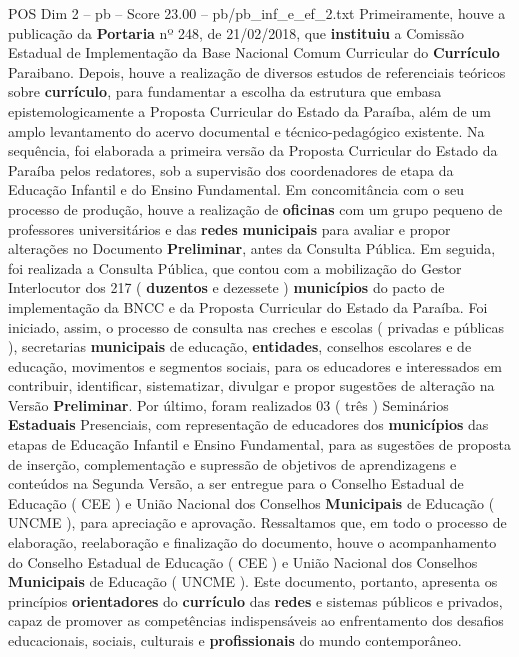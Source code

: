 \begin{textsample}{POS Dim 2 – pb – Score 23.00 – pb/pb\_inf\_e\_ef\_2.txt}
Primeiramente, houve a publicação da \textbf{Portaria} nº 248, de 21/02/2018, que \textbf{instituiu} a Comissão Estadual de Implementação da Base Nacional Comum Curricular do \textbf{Currículo} Paraibano.
Depois, houve a realização de diversos estudos de referenciais teóricos sobre \textbf{currículo}, para fundamentar a escolha da estrutura que embasa epistemologicamente a Proposta Curricular do Estado da Paraíba, além de um amplo levantamento do acervo documental e técnico-pedagógico existente.
Na sequência, foi elaborada a primeira versão da Proposta Curricular do Estado da Paraíba pelos redatores, sob a supervisão dos coordenadores de etapa da Educação Infantil e do Ensino Fundamental.
Em concomitância com o seu processo de produção, houve a realização de \textbf{oficinas} com um grupo pequeno de professores universitários e das \textbf{redes} \textbf{municipais} para avaliar e propor alterações no Documento \textbf{Preliminar}, antes da Consulta Pública.
Em seguida, foi realizada a Consulta Pública, que contou com a mobilização do Gestor Interlocutor dos 217 ( \textbf{duzentos} e dezessete ) \textbf{municípios} do pacto de implementação da BNCC e da Proposta Curricular do Estado da Paraíba.
Foi iniciado, assim, o processo de consulta nas creches e escolas ( privadas e públicas ), secretarias \textbf{municipais} de educação, \textbf{entidades}, conselhos escolares e de educação, movimentos e segmentos sociais, para os educadores e interessados em contribuir, identificar, sistematizar, divulgar e propor sugestões de alteração na Versão \textbf{Preliminar}.
Por último, foram realizados 03 ( três ) Seminários \textbf{Estaduais} Presenciais, com representação de educadores dos \textbf{municípios} das etapas de Educação Infantil e Ensino Fundamental, para as sugestões de proposta de inserção, complementação e supressão de objetivos de aprendizagens e conteúdos na Segunda Versão, a ser entregue para o Conselho Estadual de Educação ( CEE ) e União Nacional dos Conselhos \textbf{Municipais} de Educação ( UNCME ), para apreciação e aprovação.
Ressaltamos que, em todo o processo de elaboração, reelaboração e finalização do documento, houve o acompanhamento do Conselho Estadual de Educação ( CEE ) e União Nacional dos Conselhos \textbf{Municipais} de Educação ( UNCME ).
Este documento, portanto, apresenta os princípios \textbf{orientadores} do \textbf{currículo} das \textbf{redes} e sistemas públicos e privados, capaz de promover as competências indispensáveis ao enfrentamento dos desafios educacionais, sociais, culturais e \textbf{profissionais} do mundo contemporâneo.

\end{textsample}
